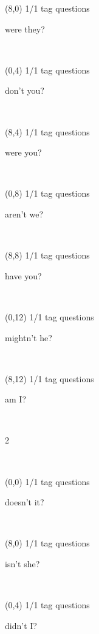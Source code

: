 \documentclass[a4paper]{article}
\newcommand{\mycard}[5]{%
	\vspace{0.1cm}
	\small #1 #2
	\par
	\parbox[t][6.7cm][c]{9.5cm}{%
	\hspace{0.1cm} \Large#3\\
	\normalsize#4 #5
	}
}
\begin{document}
\begin{textblock}{8}(8,0)
\mycard{1/1}{tag questions}{\parbox{9.0cm}{
were they?
}}{}{} 
\end{textblock}

\begin{textblock}{8}(0,4)
\mycard{1/1}{tag questions}{\parbox{9.0cm}{
don't you?
}}{}{} 
\end{textblock}

\begin{textblock}{8}(8,4)
\mycard{1/1}{tag questions}{\parbox{9.0cm}{
were you?
}}{}{} 
\end{textblock}

\begin{textblock}{8}(0,8)
\mycard{1/1}{tag questions}{\parbox{9.0cm}{
aren't we?
}}{}{} 
\end{textblock}

\begin{textblock}{8}(8,8)
\mycard{1/1}{tag questions}{\parbox{9.0cm}{
have you?
}}{}{} 
\end{textblock}

\begin{textblock}{8}(0,12)
\mycard{1/1}{tag questions}{\parbox{9.0cm}{
mightn't he?
}}{}{} 
\end{textblock}

\begin{textblock}{8}(8,12)
\mycard{1/1}{tag questions}{\parbox{9.0cm}{
am I?
}}{}{} 
\end{textblock}

\begin{tiny}2\end{tiny}\\
\newpage

\begin{textblock}{8}(0,0)
\mycard{1/1}{tag questions}{\parbox{9.0cm}{
doesn't it?
}}{}{} 
\end{textblock}

\begin{textblock}{8}(8,0)
\mycard{1/1}{tag questions}{\parbox{9.0cm}{
isn't she?
}}{}{} 
\end{textblock}

\begin{textblock}{8}(0,4)
\mycard{1/1}{tag questions}{\parbox{9.0cm}{
didn't I?
}}{}{} 
\end{textblock}
\end{document}
